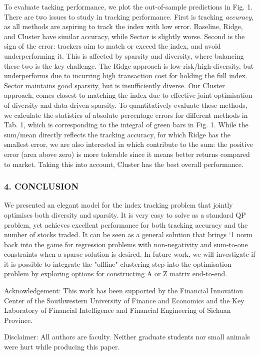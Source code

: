 \documentclass{article}
\begin{document}
To evaluate tacking performance, we plot the out-of-sample predictions in Fig. 1. There are two issues to study in tracking performance. First is tracking \textit{accuracy}, as all methods are aspiring to track the index with low error. Baseline, Ridge, and Cluster have similar accuracy, while Sector is slightly worse. Second is the sign of the error: trackers aim to match or exceed the index, and avoid underperforming it. This is affected by sparsity and diversity, where balancing these two is the key challenge. The Ridge approach is low-risk/high-diversity, but underperforms due to incurring high transaction cost for holding the full index. Sector maintains good sparsity, but is insufficiently diverse. Our Cluster approach, comes closest to matching the index due to effective joint optimisation of diversity and data-driven sparsity. To quantitatively evaluate these methods, we calculate the statistics of absolute percentage errors for different methods in Tab. 1, which is corresponding to the integral of green bars in Fig. 1. While the sum/mean directly reflects the tracking accuracy, for which Ridge has the smallest error, we are also interested in which contribute to the sum: the positive error (area above zero) is more tolerable since it means better returns compared to market. Taking this into account, Cluster has the best overall performance.

\subsubsection{4. CONCLUSION}

We presented an elegant model for the index tracking problem that jointly optimises both diversity and sparsity. It is very easy to solve as a standard QP problem, yet achieves excellent performance for both tracking accuracy and the number of stocks traded. It can be seen as a general solution that brings `1 norm back into the game for regression problems with non-negativity and sum-to-one constraints when a sparse solution is desired. In future work, we will investigate if it is possible to integrate the "offline" clustering step into the optimisation problem by exploring options for constructing A or Z matrix end-to-end.

Acknowledgement: This work has been supported by the Financial Innovation Center of the Southwestern University of Finance and Economics and the Key Laboratory of Financial Intelligence and Financial Engineering of Sichuan Province.

Disclaimer: All authors are faculty. Neither graduate students nor small animals were hurt while producing this paper.
\end{document}

